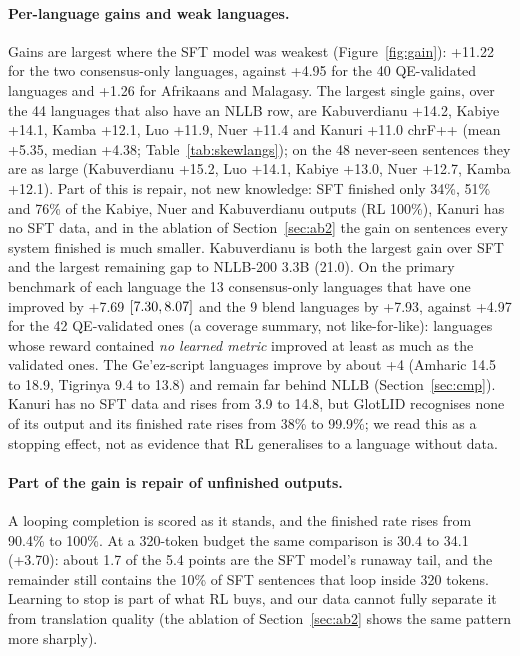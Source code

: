 \paragraph{Per-language gains and weak languages.} Gains are largest where the SFT model was weakest (Figure~\ref{fig:gain}): +11.22 for the two consensus-only languages, against +4.95 for the 40 QE-validated languages and +1.26 for Afrikaans and Malagasy. The largest single gains, over the 44 languages that also have an NLLB row, are Kabuverdianu +14.2, Kabiye +14.1, Kamba +12.1, Luo +11.9, Nuer +11.4 and Kanuri +11.0 chrF++ (mean +5.35, median +4.38; Table~\ref{tab:skewlangs}); on the 48 never-seen sentences they are as large (Kabuverdianu +15.2, Luo +14.1, Kabiye +13.0, Nuer +12.7, Kamba +12.1). Part of this is repair, not new knowledge: SFT finished only 34\%, 51\% and 76\% of the Kabiye, Nuer and Kabuverdianu outputs (RL 100\%), Kanuri has no SFT data, and in the ablation of Section~\ref{sec:ab2} the gain on sentences every system finished is much smaller. Kabuverdianu is both the largest gain over SFT and the largest remaining gap to NLLB-200 3.3B (21.0). On the primary benchmark of each language the 13 consensus-only languages that have one improved by +7.69 $[7.30, 8.07]$ and the 9 blend languages by +7.93, against +4.97 for the 42 QE-validated ones (a coverage summary, not like-for-like): languages whose reward contained \emph{no learned metric} improved at least as much as the validated ones. The Ge'ez-script languages improve by about +4 (Amharic 14.5 to 18.9, Tigrinya 9.4 to 13.8) and remain far behind NLLB (Section~\ref{sec:cmp}). Kanuri has no SFT data and rises from 3.9 to 14.8, but GlotLID recognises none of its output and its finished rate rises from 38\% to 99.9\%; we read this as a stopping effect, not as evidence that RL generalises to a language without data.

\paragraph{Part of the gain is repair of unfinished outputs.} A looping completion is scored as it stands, and the finished rate rises from 90.4\% to 100\%. At a 320-token budget the same comparison is 30.4 to 34.1 (+3.70): about 1.7 of the 5.4 points are the SFT model's runaway tail, and the remainder still contains the 10\% of SFT sentences that loop inside 320 tokens. Learning to stop is part of what RL buys, and our data cannot fully separate it from translation quality (the ablation of Section~\ref{sec:ab2} shows the same pattern more sharply).

